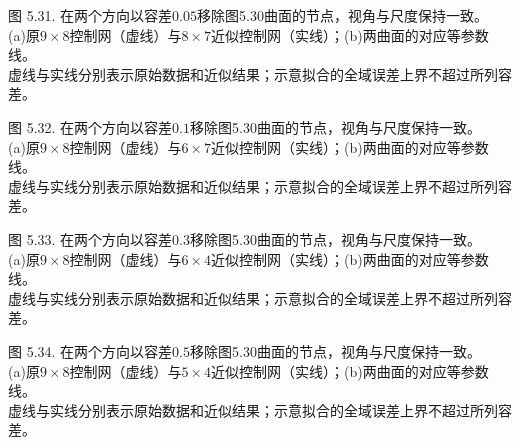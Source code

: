 \documentclass[../main.tex]{subfiles}
\begin{document}
\begin{center}
\begin{minipage}{26cm}
\vspace*{.6\baselineskip}
\centering
{}
\par\smallskip
图 5.31. 在两个方向以容差$0.05$移除图5.30曲面的节点，视角与尺度保持一致。\\
(a)原$9\times8$控制网（虚线）与$8\times7$近似控制网（实线）；(b)两曲面的对应等参数线。\\
虚线与实线分别表示原始数据和近似结果；示意拟合的全域误差上界不超过所列容差。
\end{minipage}
\end{center}

\begin{center}
\begin{minipage}{26cm}
\vspace*{.6\baselineskip}
\centering
{}
\par\smallskip
图 5.32. 在两个方向以容差$0.1$移除图5.30曲面的节点，视角与尺度保持一致。\\
(a)原$9\times8$控制网（虚线）与$6\times7$近似控制网（实线）；(b)两曲面的对应等参数线。\\
虚线与实线分别表示原始数据和近似结果；示意拟合的全域误差上界不超过所列容差。
\end{minipage}
\end{center}

\begin{center}
\begin{minipage}{26cm}
\vspace*{.6\baselineskip}
\centering
{}
\par\smallskip
图 5.33. 在两个方向以容差$0.3$移除图5.30曲面的节点，视角与尺度保持一致。\\
(a)原$9\times8$控制网（虚线）与$6\times4$近似控制网（实线）；(b)两曲面的对应等参数线。\\
虚线与实线分别表示原始数据和近似结果；示意拟合的全域误差上界不超过所列容差。
\end{minipage}
\end{center}

\begin{center}
\begin{minipage}{26cm}
\vspace*{.6\baselineskip}
\centering
{}
\par\smallskip
图 5.34. 在两个方向以容差$0.5$移除图5.30曲面的节点，视角与尺度保持一致。\\
(a)原$9\times8$控制网（虚线）与$5\times4$近似控制网（实线）；(b)两曲面的对应等参数线。\\
虚线与实线分别表示原始数据和近似结果；示意拟合的全域误差上界不超过所列容差。
\end{minipage}
\end{center}
\end{document}
